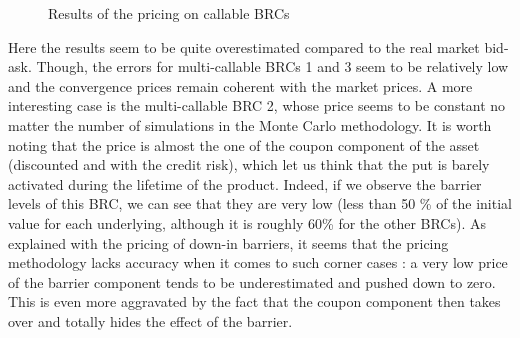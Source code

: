 \documentclass[a4paper,11pt,english]{book}
\begin{document}
\begin{figure}[H]
\begin{minipage}[b]{0.6\textwidth}
\end{minipage}
\begin{minipage}[b]{0.5\textwidth}
\end{minipage}
\caption{Results of the pricing on callable BRCs}
\label{fig:results-multi-BRC-pricing}
\end{figure}

Here the results seem to be quite overestimated compared to the real market bid-ask. Though, the errors for multi-callable BRCs 1 and 3 seem to be relatively low and the convergence prices remain coherent with the market prices. A more interesting case is the multi-callable BRC 2, whose price seems to be constant no matter the number of simulations in the Monte Carlo methodology. It is worth noting that the price is almost the one of the coupon component of the asset (discounted and with the credit risk), which let us think that the put is barely activated during the lifetime of the product. Indeed, if we observe the barrier levels of this BRC, we can see that they are very low (less than 50 \% of the initial value for each underlying, although it is roughly 60\% for the other BRCs). As explained with the pricing of down-in barriers, it seems that the pricing methodology lacks accuracy when it comes to such corner cases : a very low price of the barrier component tends to be underestimated and pushed down to zero. This is even more aggravated by the fact that the coupon component then takes over and totally hides the effect of the barrier.
\end{document}
